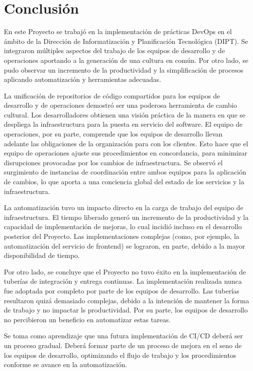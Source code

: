 %
%
%
\chapter{Conclusión}
%
En este Proyecto se trabajó en la implementación de prácticas DevOps
en el ámbito de la Dirección de Informatización y Planificación
Tecnológica (DIPT). Se integraron múltiples aspectos del trabajo de
los equipos de desarrollo y de operaciones aportando a la generación
de una cultura en común. Por otro lado, se pudo observar un incremento
de la productividad y la simplificación de procesos aplicando
automatización y herramientas adecuadas.

La unificación de repositorios de código compartidos para los equipos
de desarrollo y de operaciones demostró ser una poderosa herramienta
de cambio cultural. Los desarrolladores obtienen una visión práctica
de la manera en que se despliega la infraestructura para la puesta en
servicio del software. El equipo de operaciones, por su parte,
comprende que los equipos de desarrollo llevan adelante las
obligaciones de la organización para con los clientes. Esto hace que
el equipo de operaciones ajuste sus procedimientos en concordancia,
para minimizar disrupciones provocadas por los cambios de
infraestructura. Se observó el surgimiento de instancias de
coordinación entre ambos equipos para la aplicación de cambios, lo que
aporta a una conciencia global del estado de los servicios y la
infraestructura.

La automatización tuvo un impacto directo en la carga de trabajo del
equipo de infraestructura. El tiempo liberado generó un incremento de
la productividad y la capacidad de implementación de mejoras, lo cual
incidió incluso en el desarrollo posterior del Proyecto. Las
implementaciones complejas (como, por ejemplo, la automatización del
servicio de frontend) se lograron, en parte, debido a la mayor
disponibilidad de tiempo.

Por otro lado, se concluye que el Proyecto no tuvo éxito en la
implementación de tuberías de integración y entrega continuas. La
implementación realizada nunca fue adoptada por completo por parte de
los equipos de desarrollo. Las tuberías resultaron quizá demasiado
complejas, debido a la intención de mantener la forma de trabajo y no
impactar ls productividad. Por su parte, los equipos de desarrollo no
percibieron un beneficio en automatizar estas tareas.

Se toma como aprendizaje que una futura implementación de CI/CD deberá
ser un proceso gradual. Deberá formar parte de un proceso de mejora en
el seno de los equipos de desarrollo, optimizando el flujo de trabajo
y los procedimientos conforme se avance en la automatización.

